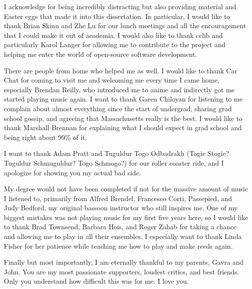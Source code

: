 \documentclass[%
  class = article,%
  crop = false,%
  float = true,%
  multi = true,%
  preview = false,%
]{standalone}
\begin{document}
I acknowledge \href{https://chemistry.stackexchange.com/users/194/}{\color{black}{Chemistry Stack Exchange}} for being incredibly distracting but also providing material and Easter eggs that made it into this dissertation. In particular, I would like to thank Brian Skinn and Zhe Lu for our lunch meetings and all the encouragement that I could make it out of academia. I would also like to thank cclib and particularly Karol Langer for allowing me to contribute to the project and helping me enter the world of open-source software development.

There are people from home who helped me as well. I would like to thank Car Chat for coming to visit me and welcoming me every time I came home, especially Brendan Reilly, who introduced me to anime and indirectly got me started playing music again. I want to thank Garen Chiloyan for listening to me complain about almost everything since the start of undergrad, sharing grad school gossip, and agreeing that Massachusetts really is the best. I would like to thank Marshall Brennan for explaining what I should expect in grad school and being right about 99\% of it.

I want to thank Adam Pratt and Tuguldur Togo Odbadrakh (Togie Stogie? Tuguldur Schmuguldur? Togo Schmogo?) for our roller coaster ride, and I apologize for showing you my actual bad side.

My degree would not have been completed if not for the massive amount of music I listened to, primarily from Alfred Brendel, Francesco Corti, Passepied, and Judy Bedford, my original bassoon instructor who still inspires me. One of my biggest mistakes was not playing music for my first five years here, so I would like to thank Brad Townsend, Barbara Hois, and Roger Zahab for taking a chance and allowing me to play in all their ensembles. I especially want to thank Linda Fisher for her patience while teaching me how to play and make reeds again.

Finally but most importantly, I am eternally thankful to my parents, Gavra and John. You are my most passionate supporters, loudest critics, and best friends. Only you understand how difficult this was for me. I love you.
\end{document}
